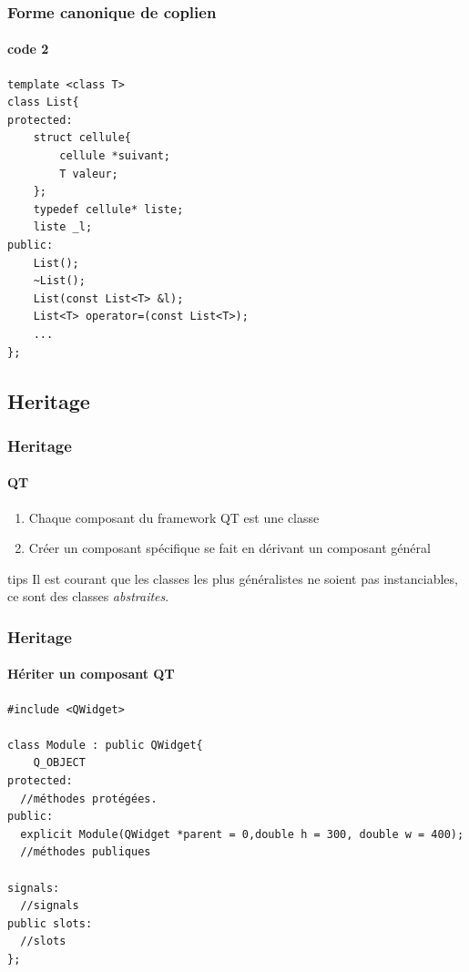 \documentclass[10pt]{beamer}
\begin{document}
\begin{frame}[fragile]
  \frametitle{Forme canonique de coplien}
  \framesubtitle{code 2}

  \begin{verbatim}
template <class T>
class List{
protected:
    struct cellule{
        cellule *suivant;
        T valeur;
    };
    typedef cellule* liste;
    liste _l;
public:
    List();
    ~List();
    List(const List<T> &l);
    List<T> operator=(const List<T>);
    ...
};
  \end{verbatim}
\end{frame}

  \subsection{Heritage}
\begin{frame}
  \frametitle{Heritage}
  \framesubtitle{QT}

  \begin{enumerate}
    \item Chaque composant du framework QT est une classe
    \item Créer un composant spécifique se fait en dérivant un composant général
  \end{enumerate}
  \begin{block}{tips}
    Il est courant que les classes les plus généralistes ne soient pas instanciables, ce sont des classes \emph{abstraites}.
  \end{block}
\end{frame}

\begin{frame}[fragile]
  \frametitle{Heritage}
  \framesubtitle{Hériter un composant QT}

  \begin{verbatim}
#include <QWidget>

class Module : public QWidget{
    Q_OBJECT
protected:
  //méthodes protégées.
public:
  explicit Module(QWidget *parent = 0,double h = 300, double w = 400);
  //méthodes publiques

signals:
  //signals
public slots:
  //slots
};
  \end{verbatim}
\end{frame}
\end{document}
